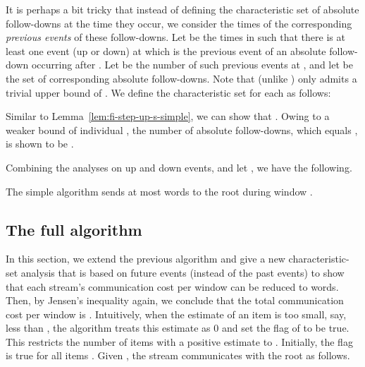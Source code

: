 \documentclass[proceedings]{stacs}
\theoremstyle{definition}\newtheorem{fact}{Fact}
\begin{document}
It is perhaps a bit tricky that
instead of defining the characteristic set of absolute follow-downs
at the time they occur,
we consider the times of the corresponding
\emph{previous events} of these follow-downs.
Let  be the times in  such that
there is at least one event  (up or down) at  which is the
previous event of an absolute follow-down  occurring after .
Let  be the number of such previous events at , and
let  be the set of corresponding absolute follow-downs.
Note that  (unlike ) only admits
a trivial upper bound of .
We define
the characteristic set  for each  as follows:

Similar to Lemma~\ref{lem:fi-step-up-s-simple}, we can show
that . Owing to a weaker bound of individual , the number
of absolute follow-downs, which equals
, is shown to be
.

\vspace{.5ex}
Combining the analyses on up and down events,
and let ,  we have the following.
\begin{theorem}\label{thm:simple}
  {
The simple algorithm
sends at most  words
to the root during window .}
\end{theorem}

\vspace*{-1ex}
\subsection{The full algorithm}
\label{sect:fullAlg}
\vspace*{-1ex}
In this section, we extend the previous algorithm and
give a new characteristic-set analysis that is based on
future events (instead of the past events) to show that
  {each stream's communication cost per window can be
  reduced to
 words.  Then,
by Jensen's inequality again, we conclude that the total
communication cost
per window is .}
Intuitively, when the estimate  of an item  is too small,
say, less than ,
the algorithm treats this estimate as 0 and
set the   flag of  to be true.
This restricts the number of items with a positive estimate
to .
Initially, the  flag is true for all items .
Given    {},
 the stream communicates with the root as follows.
\end{document}
